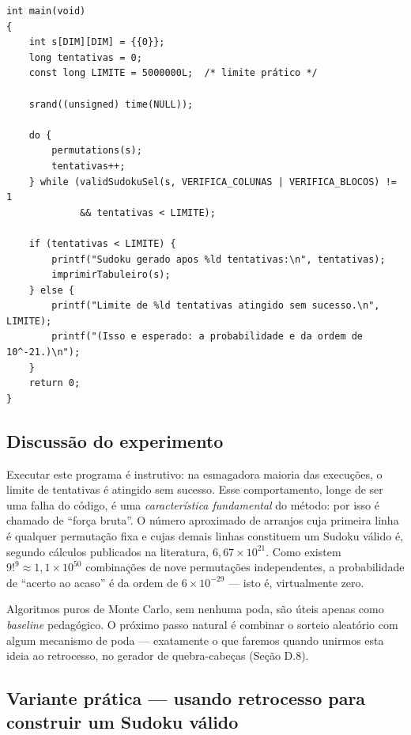 \documentclass[11pt,a4paper,oneside]{report}
\begin{document}
\begin{lstlisting}[caption={Gerador por permutações aleatórias --- prova de conceito.},label={lst:gerador_perm}]
int main(void)
{
    int s[DIM][DIM] = {{0}};
    long tentativas = 0;
    const long LIMITE = 5000000L;  /* limite prático */

    srand((unsigned) time(NULL));

    do {
        permutations(s);
        tentativas++;
    } while (validSudokuSel(s, VERIFICA_COLUNAS | VERIFICA_BLOCOS) != 1
             && tentativas < LIMITE);

    if (tentativas < LIMITE) {
        printf("Sudoku gerado apos %ld tentativas:\n", tentativas);
        imprimirTabuleiro(s);
    } else {
        printf("Limite de %ld tentativas atingido sem sucesso.\n", LIMITE);
        printf("(Isso e esperado: a probabilidade e da ordem de 10^-21.)\n");
    }
    return 0;
}
\end{lstlisting}

\subsection{Discussão do experimento}

Executar este programa é instrutivo: na esmagadora maioria das execuções,
o limite de tentativas é atingido sem sucesso. Esse comportamento, longe
de ser uma falha do código, é uma \emph{característica fundamental} do
método: por isso é chamado de ``força bruta''. O número aproximado de
arranjos cuja primeira linha é qualquer permutação fixa e cujas demais
linhas constituem um Sudoku válido é, segundo cálculos publicados na
literatura, $6{,}67 \times 10^{21}$. Como existem $9!^9 \approx 1{,}1 \times 10^{50}$
combinações de nove permutações independentes, a probabilidade de ``acerto
ao acaso'' é da ordem de $6 \times 10^{-29}$ --- isto é, virtualmente zero.

\begin{engenharia}
Algoritmos puros de Monte Carlo, sem nenhuma poda, são úteis apenas como
\emph{baseline} pedagógico. O próximo passo natural é combinar o sorteio
aleatório com algum mecanismo de poda --- exatamente o que faremos quando
unirmos esta ideia ao retrocesso, no gerador de quebra-cabeças (Seção D.8).
\end{engenharia}

\subsection{Variante prática --- usando retrocesso para construir um Sudoku válido}
\end{document}
